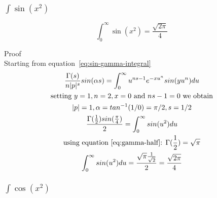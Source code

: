 \documentclass[a4paper]{article}
\begin{document}
    \subsubsection{$\int \sin(x^2)$}

    \begin{theorem}
        \begin{equation}
            \boxed{
                \int_{0}^{\infty} \sin(x^2) = \frac{\sqrt{2\pi}}{4}
            }\label{eq:equation19}
        \end{equation}

        Proof
        \\
        Starting from equation~\ref{eq:sin-gamma-integral}
        \begin{gather*}
            \frac{\Gamma(s)}{n |p|^s} sin(\alpha s)= \int_{0}^{\infty} u^{ns -1} e^{-x u^{n}} sin(y u^n) du
            \\
            \text{setting $y=1, n=2, x=0$ and $ns -1 = 0$ we obtain}
            \\
            |p| = 1, \alpha = tan^{-1}(1/0) = \pi/2, s = 1/2
            \\
            \frac{\Gamma(\frac{1}{2}) sin(\frac{\pi}{4})}{2} = \int_{0}^{\infty} sin(u^2) du
            \\
            \text{using equation~\ref{eq:gamma-half}: } \Gamma(\frac{1}{2}) = \sqrt{\pi}
            \\
            \int_{0}^{\infty} sin(u^2) du = \frac{\sqrt{\pi} \frac{1}{\sqrt{2}}}{2}
            = \frac{\sqrt{2\pi}}{4}
        \end{gather*}
    \end{theorem}

    \subsubsection{$\int \cos(x^2)$}
\end{document}
